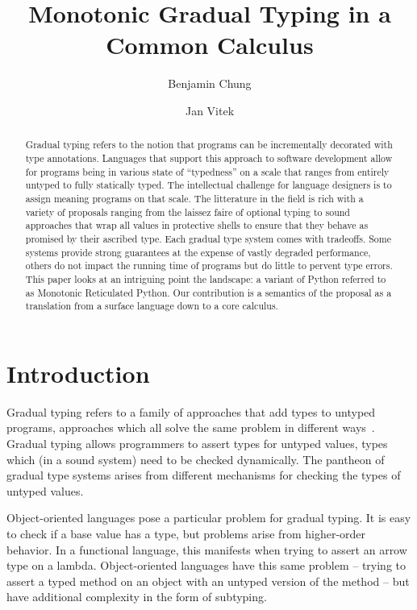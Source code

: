 \documentclass[sigconf]{acmart}
\begin{document}
\title{Monotonic Gradual Typing in a Common Calculus}
\subtitle{}

\author{Benjamin Chung}
\author{Jan Vitek}


\begin{abstract}
Gradual typing refers to the notion that programs can be incrementally
decorated with type annotations. Languages that
support this approach to software development allow for programs being in
various state of ``typedness'' on a scale that ranges from entirely untyped
to fully statically typed. The intellectual challenge for language designers
is to assign meaning programs on that scale. The litterature in the field is
rich with a variety of proposals ranging from the laissez faire of optional
typing to sound approaches that wrap all values in protective shells to
ensure that they behave as promised by their ascribed type. Each gradual
type system comes with tradeoffs. Some systems provide strong guarantees at
the expense of vastly degraded performance, others do not impact the running
time of programs but do little to pervent type errors. This paper looks at
an intriguing point the landscape: a variant of Python referred to as
Monotonic Reticulated Python. Our contribution is a semantics of the
proposal as a translation from a surface language down to a core calculus.
\end{abstract}



\maketitle

\section{Introduction}

Gradual typing refers to a family of approaches that add types to untyped
programs, approaches which all solve the same problem in different
ways~\cite{SiekTaha06,tf-dls06}.  Gradual typing allows programmers to
assert types for untyped values, types which (in a sound system) need to be
checked dynamically. The pantheon of gradual type systems arises from
different mechanisms for checking the types of untyped values.

Object-oriented languages pose a particular problem for gradual typing. It
is easy to check if a base value has a type, but problems arise from
higher-order behavior. In a functional language, this manifests when trying
to assert an arrow type on a lambda. Object-oriented languages have this
same problem -- trying to assert a typed method on an object with an untyped
version of the method -- but have additional complexity in the form of
subtyping.
\end{document}

